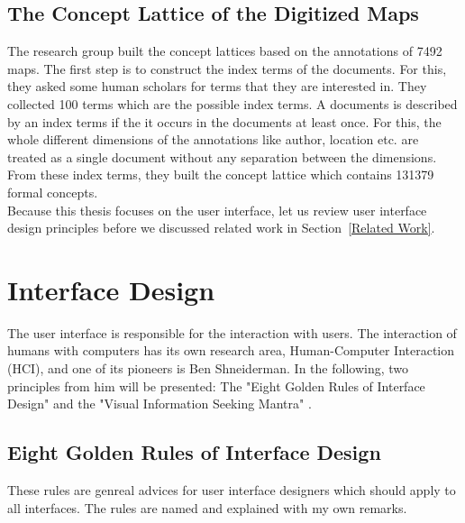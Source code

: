 \documentclass[11pt]{report}
\begin{document}
\subsection{The Concept Lattice of the Digitized Maps}
\label{thedata}

The research group built the concept lattices based on the annotations of 7492 maps. The first step is to construct the index terms of the documents. For this, they asked some human scholars for terms that they are interested in. They collected 100 terms which are the possible index terms. A documents is described by an index terms if the it occurs in the documents at least once. For this, the whole different dimensions of the annotations like author, location etc. are treated as a single document without any separation between the dimensions. From these index terms, they built the concept lattice which contains 131379 formal concepts.\\

Because this thesis focuses on the user interface, let us review user interface design principles before we discussed related work in Section~\ref{Related Work}.

\section{Interface Design}
\label{id}

The user interface is responsible for the interaction with users. The interaction of humans with computers has its own research area, Human-Computer Interaction (HCI), and one of its pioneers is Ben Shneiderman. In the following, two principles from him will be presented: The "Eight Golden Rules of Interface Design" \cite{Shneiderman2010} and the "Visual Information Seeking Mantra" \cite{Shneiderman1996}.

\subsection{Eight Golden Rules of Interface Design}
\label{Golden}

These rules \cite{Shneiderman2010} are genreal advices for user interface designers which should apply to all interfaces. The rules are named and explained with my own remarks. \\
\end{document}
